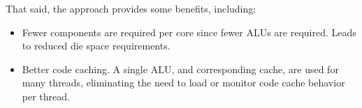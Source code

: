 That said, the approach provides some benefits, including:

\begin{itemize}
	\item Fewer components are required per core since fewer ALUs are required. Leads to reduced die space requirements.
	\item Better code caching. A single ALU, and corresponding cache, are used for many threads, eliminating the need to load or monitor code cache behavior per thread.
\end{itemize}





